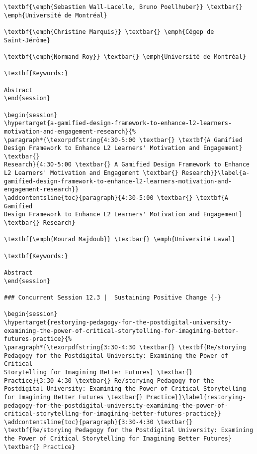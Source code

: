 \documentclass[
]{book}
\begin{document}
\begin{verbatim}
\textbf{\emph{Sebastien Wall-Lacelle, Bruno Poellhuber}} \textbar{}
\emph{Université de Montréal}

\textbf{\emph{Christine Marquis}} \textbar{} \emph{Cégep de
Saint-Jérôme}

\textbf{\emph{Normand Roy}} \textbar{} \emph{Université de Montréal}

\textbf{Keywords:}

Abstract
\end{session}

\begin{session}
\hypertarget{a-gamified-design-framework-to-enhance-l2-learners-motivation-and-engagement-research}{%
\paragraph*{\texorpdfstring{4:30-5:00 \textbar{} \textbf{A Gamified
Design Framework to Enhance L2 Learners' Motivation and Engagement}
\textbar{}
Research}{4:30-5:00 \textbar{} A Gamified Design Framework to Enhance L2 Learners' Motivation and Engagement \textbar{} Research}}\label{a-gamified-design-framework-to-enhance-l2-learners-motivation-and-engagement-research}}
\addcontentsline{toc}{paragraph}{4:30-5:00 \textbar{} \textbf{A Gamified
Design Framework to Enhance L2 Learners' Motivation and Engagement}
\textbar{} Research}

\textbf{\emph{Mourad Majdoub}} \textbar{} \emph{Université Laval}

\textbf{Keywords:}

Abstract
\end{session}

### Concurrent Session 12.3 |  Sustaining Positive Change {-}

\begin{session}
\hypertarget{restorying-pedagogy-for-the-postdigital-university-examining-the-power-of-critical-storytelling-for-imagining-better-futures-practice}{%
\paragraph*{\texorpdfstring{3:30-4:30 \textbar{} \textbf{Re/storying
Pedagogy for the Postdigital University: Examining the Power of Critical
Storytelling for Imagining Better Futures} \textbar{}
Practice}{3:30-4:30 \textbar{} Re/storying Pedagogy for the Postdigital University: Examining the Power of Critical Storytelling for Imagining Better Futures \textbar{} Practice}}\label{restorying-pedagogy-for-the-postdigital-university-examining-the-power-of-critical-storytelling-for-imagining-better-futures-practice}}
\addcontentsline{toc}{paragraph}{3:30-4:30 \textbar{}
\textbf{Re/storying Pedagogy for the Postdigital University: Examining
the Power of Critical Storytelling for Imagining Better Futures}
\textbar{} Practice}


\end{verbatim}
\end{document}
